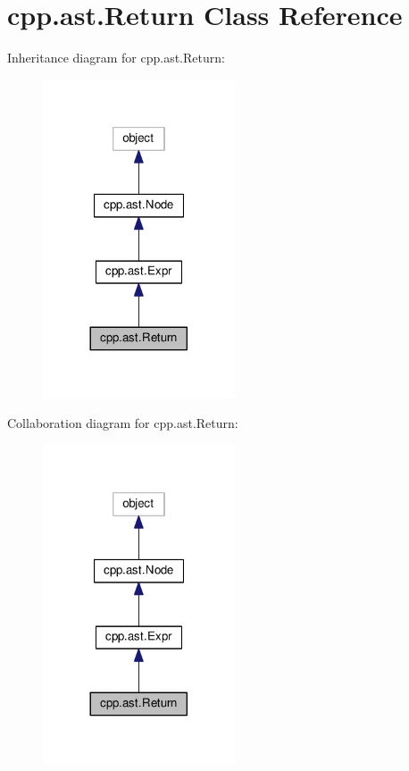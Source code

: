 \hypertarget{classcpp_1_1ast_1_1_return}{}\section{cpp.\+ast.\+Return Class Reference}
\label{classcpp_1_1ast_1_1_return}


Inheritance diagram for cpp.\+ast.\+Return\+:
\nopagebreak
\begin{figure}[H]
\begin{center}
\leavevmode
\includegraphics[width=161pt]{classcpp_1_1ast_1_1_return__inherit__graph}
\end{center}
\end{figure}


Collaboration diagram for cpp.\+ast.\+Return\+:
\nopagebreak
\begin{figure}[H]
\begin{center}
\leavevmode
\includegraphics[width=161pt]{classcpp_1_1ast_1_1_return__coll__graph}
\end{center}
\end{figure}
